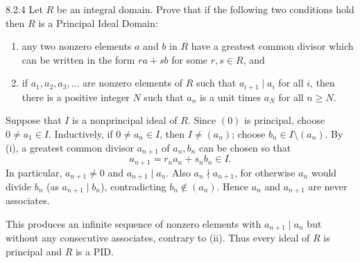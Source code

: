 \documentclass[11pt,oneside]{article}
\begin{document}
\begin{exercise}{8.2.4}
Let $R$ be an integral domain. Prove that if the following two conditions hold then $R$ is a Principal Ideal Domain:
\begin{enumerate}[label=(\roman*),leftmargin=2.5em,itemsep=0.25em,topsep=0.35em]
\item any two nonzero elements $a$ and $b$ in $R$ have a greatest common divisor which can be written in the form $ra+sb$ for some $r,s\in R$, and
\item if $a_1,a_2,a_3,\ldots$ are nonzero elements of $R$ such that $a_{i+1}\mid a_i$ for all $i$, then there is a positive integer $N$ such that $a_n$ is a unit times $a_N$ for all $n\ge N$.
\end{enumerate}
\end{exercise}
\begin{solution}
Suppose that $I$ is a nonprincipal ideal of $R$. Since $(0)$ is principal, choose $0\neq a_1\in I$. Inductively, if $0\neq a_n\in I$, then $I\neq(a_n)$; choose $b_n\in I\setminus(a_n)$. By (i), a greatest common divisor $a_{n+1}$ of $a_n,b_n$ can be chosen so that
\[
a_{n+1}=r_na_n+s_nb_n\in I.
\]
In particular, $a_{n+1}\neq0$ and $a_{n+1}\mid a_n$. Also $a_n\nmid a_{n+1}$, for otherwise $a_n$ would divide $b_n$ (as $a_{n+1}\mid b_n$), contradicting $b_n\notin(a_n)$. Hence $a_n$ and $a_{n+1}$ are never associates.

This produces an infinite sequence of nonzero elements with $a_{n+1}\mid a_n$ but without any consecutive associates, contrary to (ii). Thus every ideal of $R$ is principal and $R$ is a PID.
\end{solution}
\end{document}

